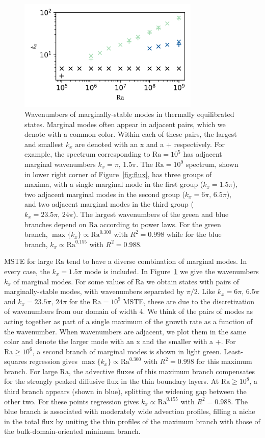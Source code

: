 \documentclass[reprint,amsmath,amssymb,aps,nofootinbib]{revtex4-1}
\newcommand\Ra{\mathrm{Ra}}
\begin{document}
\begin{figure}
    \centering
    \includegraphics[width=3.4in]{kx_m_ra1.png}
    \caption{Wavenumbers of marginally-stable modes in thermally equilibrated states. 
    Marginal modes often appear in adjacent pairs, which we denote with a common color. 
    Within each of these pairs, the largest and smallest $k_x$ are denoted with an x and a + respectively.
    For example, the spectrum corresponding to $\Ra = 10^5$ has adjacent marginal wavenumbers $k_x = \pi, \, 1.5\pi$. 
    The $\Ra = 10^9$ spectrum, shown in lower right corner of Figure~\ref{fig:flux}, has three groups of maxima, with a single marginal mode in the first group ($k_x = 1.5\pi$), two adjacent marginal modes in the second group ($k_x = 6\pi, \, 6.5\pi$), and two adjacent marginal modes in the third group ($k_x = 23.5\pi, \, 24\pi$). 
    The largest wavenumbers of the green and blue branches depend on  $\Ra$ according to power laws.
    For the green branch, $\max\{k_x\} \propto \Ra^{0.300}$ with $R^2 = 0.998$ while for the blue branch, $k_x \propto \Ra^{0.155}$ with $R^2 = 0.988$.}
    \label{fig:kx_marginals}
\end{figure}

MSTE for large $\Ra$ tend to have a diverse combination of marginal modes.
In every case, the $k_x = 1.5\pi$ mode is included. 
In Figure~\ref{fig:kx_marginals} we give the wavenumbers $k_x$ of marginal modes. 
For some values of $\Ra$ we obtain states with pairs of marginally-stable modes, with wavenumbers separated by $\pi/2$.
Like $k_x = 6\pi, \, 6.5\pi$ and $k_x=23.5\pi, \, 24\pi$ for the $\Ra=10^9$ MSTE, these are due to the discretization of wavenumbers from our domain of width 4.
We think of the pairs of modes as acting together as part of a single maximum of the growth rate as a function of the wavenumber.
When wavenumbers are adjacent, we plot them in the same color and denote the larger mode with an x and the smaller with a +.
For $\Ra \geq 10^6$, a second branch of marginal modes is shown in light green. 
Least-squares regression gives $\max\{k_x\} \propto \Ra^{0.300}$ with $R^2 = 0.998$ for this maximum branch.
For large $\Ra$, the advective fluxes of this maximum branch compensates for the strongly peaked diffusive flux in the thin boundary layers. 
At $\Ra \geq 10^8$, a third branch appears (shown in blue), splitting the widening gap between the other two. 
For these points regression gives $k_x \propto \Ra^{0.155}$ with $R^2 = 0.988$.
The blue branch is associated with moderately wide advection profiles, filling a niche in the total flux by uniting the thin profiles of the maximum branch with those of the bulk-domain-oriented minimum branch.
\end{document}
